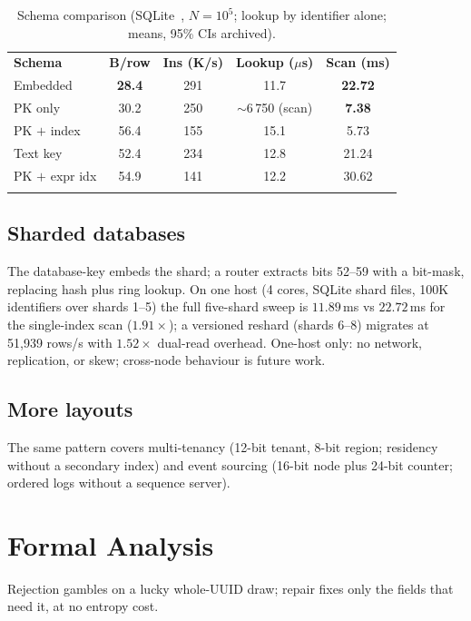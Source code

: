 \documentclass{svproc}
\begin{document}
\begin{table}[t]
\caption{Schema comparison (SQLite~\cite{22}, $N=10^5$; lookup by identifier alone; means, 95\% CIs archived).}
\label{tab:composite}
\centering\scriptsize\setlength{\tabcolsep}{3pt}
\begin{tabular}{lcccc}
\hline\noalign{\smallskip}
\textbf{Schema} & \textbf{B/row} & \textbf{Ins (K/s)} & \textbf{Lookup ($\mu$s)} & \textbf{Scan (ms)} \\
\noalign{\smallskip}\hline\noalign{\smallskip}
Embedded      & \textbf{28.4} & 291 & 11.7 & \textbf{22.72} \\
PK only       & 30.2 & 250 & $\sim$6\,750 (scan) & \textbf{7.38} \\
PK $+$ index  & 56.4 & 155 & 15.1 & 5.73 \\
Text key      & 52.4 & 234 & 12.8 & 21.24 \\
PK $+$ expr idx & 54.9 & 141 & 12.2 & 30.62 \\
\noalign{\smallskip}\hline
\end{tabular}
\end{table}

\subsection{Sharded databases}
The database-key embeds the shard; a router extracts bits 52--59 with a bit-mask, replacing hash plus ring lookup. \label{sec:cluster} On one host (4 cores, SQLite shard files, 100K identifiers over shards 1--5) the full five-shard sweep is $11.89$\,ms vs $22.72$\,ms for the single-index scan ($1.91\times$); a versioned reshard (shards 6--8) migrates at 51{,}939 rows/s with $1.52\times$ dual-read overhead. One-host only: no network, replication, or skew; cross-node behaviour is future work.

\subsection{More layouts}
The same pattern covers multi-tenancy (12-bit tenant, 8-bit region; residency without a secondary index) and event sourcing (16-bit node plus 24-bit counter; ordered logs without a sequence server).

\section{Formal Analysis}
\label{sec:formal}
Rejection gambles on a lucky whole-UUID draw; repair fixes only the fields that need it, at no entropy cost.
\end{document}
